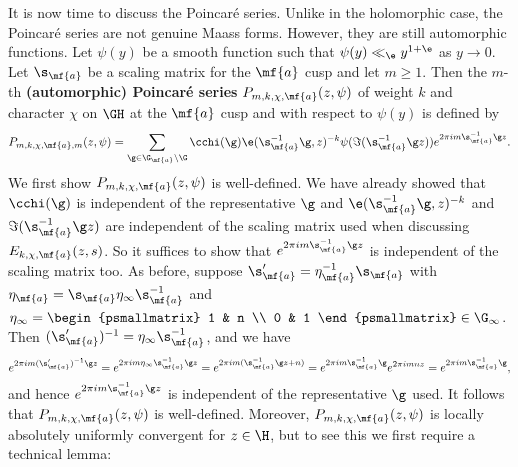     It is now time to discuss the Poincar\'e series. Unlike in the holomorphic case, the Poincar\'e series are not genuine Maass forms. However, they are still automorphic functions. Let $\psi(y)$ be a smooth function such that $\psi(y) \ll_{\e} y^{1+\e}$ as $y \to 0$. Let $\s_{\mf{a}}$ be a scaling matrix for the $\mf{a}$ cusp and let $m \ge 1$. Then the $m$-th \textbf{(automorphic) Poincar\'e series} $P_{m,k,\chi,\mf{a}}(z,\psi)$ of weight $k$ and character $\chi$ on $\GH$ at the $\mf{a}$ cusp and with respect to $\psi(y)$ is defined by
    \[
      P_{m,k,\chi,\mf{a},m}(z,\psi) = \sum_{\g \in \G_{\mf{a}}\backslash\G}\cchi(\g)\e(\s_{\mf{a}}^{-1}\g,z)^{-k}\psi(\Im(\s_{\mf{a}}^{-1}\g z))e^{2\pi im\s_{\mf{a}}^{-1}\g z}.
    \]
    We first show $P_{m,k,\chi,\mf{a}}(z,\psi)$ is well-defined. We have already showed that $\cchi(\g)$ is independent of the representative $\g$ and $\e(\s_{\mf{a}}^{-1}\g,z)^{-k}$ and $\Im(\s_{\mf{a}}^{-1}\g z)$ are independent of the scaling matrix used when discussing $E_{k,\chi,\mf{a}}(z,s)$. So it suffices to show that $e^{2\pi im\s_{\mf{a}}^{-1}\g z}$ is independent of the scaling matrix too. As before, suppose $\s_{\mf{a}}' = \eta_{\mf{a}}^{-1}\s_{\mf{a}}$ with $\eta_{\mf{a}} = \s_{\mf{a}}\eta_{\infty}\s_{\mf{a}}^{-1}$ and $\eta_{\infty} = \begin{psmallmatrix} 1 & n \\ 0 & 1 \end{psmallmatrix} \in \G_{\infty}$. Then $(\s_{\mf{a}}')^{-1} = \eta_{\infty}\s_{\mf{a}}^{-1}$, and we have
    \[
      e^{2\pi im(\s_{\mf{a}}')^{-1}\g z} = e^{2\pi im\eta_{\infty}\s_{\mf{a}}^{-1}\g z} = e^{2\pi im(\s_{\mf{a}}^{-1}\g z+n)} = e^{2\pi im\s_{\mf{a}}^{-1}\g}e^{2\pi imnz} = e^{2\pi im\s_{\mf{a}}^{-1}\g},
    \]
    and hence $e^{2\pi im\s_{\mf{a}}^{-1}\g z}$ is independent of the representative $\g$ used. It follows that $P_{m,k,\chi,\mf{a}}(z,\psi)$ is well-defined. Moreover, $P_{m,k,\chi,\mf{a}}(z,\psi)$ is locally absolutely uniformly convergent for $z \in \H$, but to see this we first require a technical lemma:

